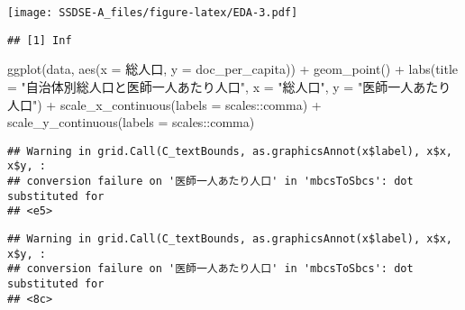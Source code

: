 \documentclass[
]{article}
\newenvironment{Shaded}{\begin{snugshade}}{\end{snugshade}}
\newcommand{\AttributeTok}[1]{\textcolor[rgb]{0.77,0.63,0.00}{#1}}
\newcommand{\CommentTok}[1]{\textcolor[rgb]{0.56,0.35,0.01}{\textit{#1}}}
\newcommand{\FunctionTok}[1]{\textcolor[rgb]{0.00,0.00,0.00}{#1}}
\newcommand{\NormalTok}[1]{#1}
\newcommand{\OtherTok}[1]{\textcolor[rgb]{0.56,0.35,0.01}{#1}}
\newcommand{\SpecialCharTok}[1]{\textcolor[rgb]{0.00,0.00,0.00}{#1}}
\newcommand{\StringTok}[1]{\textcolor[rgb]{0.31,0.60,0.02}{#1}}
\begin{document}
\texttt{[image: SSDSE-A\_files/figure-latex/EDA-3.pdf]}

\begin{Shaded}
\end{Shaded}

\begin{verbatim}
## [1] Inf
\end{verbatim}

\begin{Shaded}
\begin{Highlighting}[]
\FunctionTok{ggplot}\NormalTok{(data, }\FunctionTok{aes}\NormalTok{(}\AttributeTok{x =}\NormalTok{ 総人口, }\AttributeTok{y =}\NormalTok{ doc\_per\_capita)) }\SpecialCharTok{+} \FunctionTok{geom\_point}\NormalTok{() }\SpecialCharTok{+} 
  \FunctionTok{labs}\NormalTok{(}\AttributeTok{title =} \StringTok{"自治体別総人口と医師一人あたり人口"}\NormalTok{, }\AttributeTok{x =} \StringTok{"総人口"}\NormalTok{, }\AttributeTok{y =} \StringTok{"医師一人あたり人口"}\NormalTok{) }\SpecialCharTok{+}
  \FunctionTok{scale\_x\_continuous}\NormalTok{(}\AttributeTok{labels =}\NormalTok{ scales}\SpecialCharTok{::}\NormalTok{comma) }\SpecialCharTok{+}
  \FunctionTok{scale\_y\_continuous}\NormalTok{(}\AttributeTok{labels =}\NormalTok{ scales}\SpecialCharTok{::}\NormalTok{comma)}
\end{Highlighting}
\end{Shaded}

\begin{verbatim}
## Warning in grid.Call(C_textBounds, as.graphicsAnnot(x$label), x$x, x$y, :
## conversion failure on '医師一人あたり人口' in 'mbcsToSbcs': dot substituted for
## <e5>
\end{verbatim}

\begin{verbatim}
## Warning in grid.Call(C_textBounds, as.graphicsAnnot(x$label), x$x, x$y, :
## conversion failure on '医師一人あたり人口' in 'mbcsToSbcs': dot substituted for
## <8c>
\end{verbatim}
\end{document}
